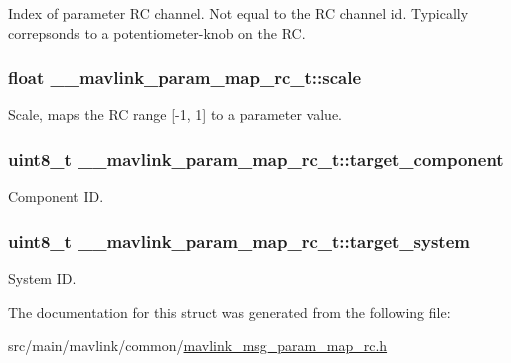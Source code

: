 Index of parameter R\+C channel. Not equal to the R\+C channel id. Typically correpsonds to a potentiometer-\/knob on the R\+C. 

\hypertarget{struct____mavlink__param__map__rc__t_acf3ae7ae3426c1a59f1f40e595b68cfc}{
\subsubsection[{scale}]{\setlength{\rightskip}{0pt plus 5cm}float \+\_\+\+\_\+mavlink\+\_\+param\+\_\+map\+\_\+rc\+\_\+t\+::scale}}\label{struct____mavlink__param__map__rc__t_acf3ae7ae3426c1a59f1f40e595b68cfc}


Scale, maps the R\+C range \mbox{[}-\/1, 1\mbox{]} to a parameter value. 

\hypertarget{struct____mavlink__param__map__rc__t_a130e7aa1a35686836a1a67ecd27e1366}{
\subsubsection[{target\+\_\+component}]{\setlength{\rightskip}{0pt plus 5cm}uint8\+\_\+t \+\_\+\+\_\+mavlink\+\_\+param\+\_\+map\+\_\+rc\+\_\+t\+::target\+\_\+component}}\label{struct____mavlink__param__map__rc__t_a130e7aa1a35686836a1a67ecd27e1366}


Component I\+D. 

\hypertarget{struct____mavlink__param__map__rc__t_a38edd34d043c0c496e9021ec2208026e}{
\subsubsection[{target\+\_\+system}]{\setlength{\rightskip}{0pt plus 5cm}uint8\+\_\+t \+\_\+\+\_\+mavlink\+\_\+param\+\_\+map\+\_\+rc\+\_\+t\+::target\+\_\+system}}\label{struct____mavlink__param__map__rc__t_a38edd34d043c0c496e9021ec2208026e}


System I\+D. 



The documentation for this struct was generated from the following file\+:\begin{DoxyCompactItemize}
\item 
src/main/mavlink/common/\hyperlink{mavlink__msg__param__map__rc_8h}{mavlink\+\_\+msg\+\_\+param\+\_\+map\+\_\+rc.\+h}\end{DoxyCompactItemize}
